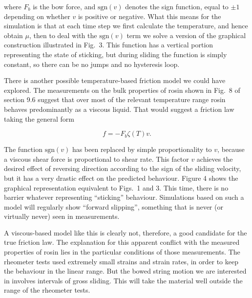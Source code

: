   \noindent{}where $F_b$ is the bow force, and $\mathrm{sgn}(v)$ denotes the 
  sign function, equal to $\pm1$ depending on whether $v$ is positive or 
  negative. What this means for the simulation is that at each time step we 
  first calculate the temperature, and hence obtain $\mu$, then to deal with 
  the $\mathrm{sgn}(v)$ term we solve a version of the graphical construction 
  illustrated in Fig.\ 3. This function has a vertical portion representing the 
  state of sticking, but during sliding the function is simply constant, so 
  there can be no jumps and no hysteresis loop. 


  There is another possible temperature-based friction model we could have 
  explored. The measurements on the bulk properties of rosin shown in Fig.\ 8 
  of section 9.6 suggest that over most of the relevant temperature range rosin 
  behaves predominantly as a viscous liquid. That would suggest a friction law 
  taking the general form 

  \begin{equation*}f=-F_b \zeta(T) v . \tag{2}\end{equation*} 

  The function $\mathrm{sgn}(v)$ has been replaced by simple proportionality to 
  $v$, because a viscous shear force is proportional to shear rate. This factor 
  $v$ achieves the desired effect of reversing direction according to the sign 
  of the sliding velocity, but it has a very drastic effect on the predicted 
  behaviour. Figure 4 shows the graphical representation equivalent to Figs.\ 1 
  and 3. This time, there is no barrier whatever representing ``sticking'' 
  behaviour. Simulations based on such a model will regularly show ``forward 
  slipping'', something that is never (or virtually never) seen in 
  measurements. 


  A viscous-based model like this is clearly not, therefore, a good candidate 
  for the true friction law. The explanation for this apparent conflict with 
  the measured properties of rosin lies in the particular conditions of those 
  measurements. The rheometer tests used extremely small strains and strain 
  rates, in order to keep the behaviour in the linear range. But the bowed 
  string motion we are interested in involves intervals of gross sliding. This 
  will take the material well outside the range of the rheometer tests. 

